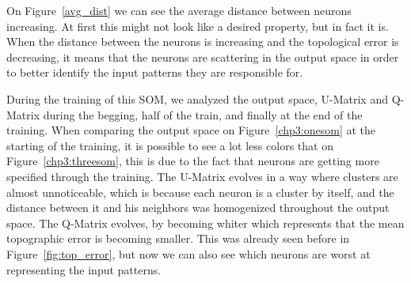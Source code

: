 On Figure~\ref{avg_dist} we can see the average distance between neurons increasing. At first this might not look like a desired property, but in fact it is. When the distance between the neurons is increasing and the topological error is decreasing, it means that the neurons are scattering in the output space in order to better identify the input patterns they are responsible for.

During the training of this \ac{SOM}, we analyzed the output space, \ac{U-Matrix} and \ac{Q-Matrix} during the begging, half of the train, and finally at the end of the training.
When comparing the output space on Figure~\ref{chp3:onesom} at the starting of the training, it is possible to see a lot less colors that on Figure~\ref{chp3:threesom}, this is due to the fact that neurons are getting more specified through the training. 
The \ac{U-Matrix} evolves in a way where clusters are almost unnoticeable, which is because each neuron is a cluster by itself, and the distance between it and his neighbors was homogenized throughout the output space. 
The \ac{Q-Matrix} evolves, by becoming whiter which represents that the mean topographic error is becoming smaller. This was already seen before in Figure~\ref{fig:top_error}, but now we can also see which neurons are worst at representing the input patterns.  

